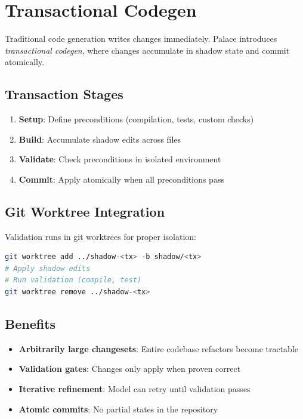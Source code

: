 \documentclass[11pt,a4paper]{article}
\begin{document}
\section{Transactional Codegen}

Traditional code generation writes changes immediately.
Palace introduces \emph{transactional codegen}, where changes accumulate
in shadow state and commit atomically.

\subsection{Transaction Stages}

\begin{enumerate}
    \item \textbf{Setup}: Define preconditions (compilation, tests, custom checks)
    \item \textbf{Build}: Accumulate shadow edits across files
    \item \textbf{Validate}: Check preconditions in isolated environment
    \item \textbf{Commit}: Apply atomically when all preconditions pass
\end{enumerate}

\subsection{Git Worktree Integration}

Validation runs in git worktrees for proper isolation:

\begin{lstlisting}[language=bash]
git worktree add ../shadow-<tx> -b shadow/<tx>
# Apply shadow edits
# Run validation (compile, test)
git worktree remove ../shadow-<tx>
\end{lstlisting}

\subsection{Benefits}

\begin{itemize}
    \item \textbf{Arbitrarily large changesets}: Entire codebase refactors become tractable
    \item \textbf{Validation gates}: Changes only apply when proven correct
    \item \textbf{Iterative refinement}: Model can retry until validation passes
    \item \textbf{Atomic commits}: No partial states in the repository
\end{itemize}
\end{document}
